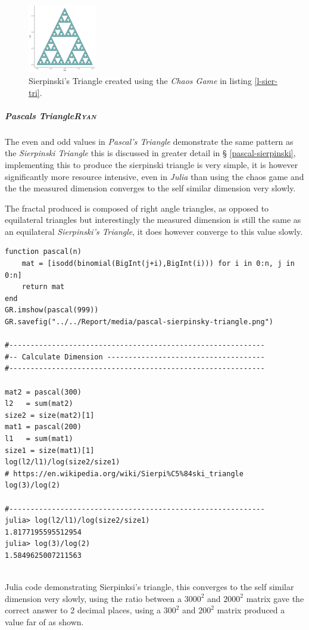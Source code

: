 \documentclass[a4paper,11pt,twoside]{article}
\begin{document}
\begin{figure}
\centering
\includegraphics[width=3cm]{pascal-sierpinsky-chaos-game.png}
\caption{\label{fig:s-tri}Sierpinski's Triangle created using the \emph{Chaos Game} in listing \ref{l-sier-tri}.}
\end{figure}

\subparagraph{Pascals Triangle\hfill{}\textsc{Ryan}}
\label{pas-tri}
The even and odd values in \emph{Pascal's Triangle} demonstrate the same pattern as
the \emph{Sierpinski Triangle} this is discussed in greater detail in \S
\ref{pascal-sierpinski}, implementing this to produce the sierpinski triangle is very
simple, it is however significantly more resource intensive, even in \emph{Julia}
than using the chaos game and the the measured dimension converges to the self
similar dimension very slowly.

The fractal produced is composed of right angle triangles, as opposed to equilateral triangles but interestingly the measured dimension is still the same as an equilateral \emph{Sierpinski's Triangle}, it does however converge to this value slowly.

\begin{listing}[htbp]
\begin{verbatim}
function pascal(n)
    mat = [isodd(binomial(BigInt(j+i),BigInt(i))) for i in 0:n, j in 0:n]
    return mat
end
GR.imshow(pascal(999))
GR.savefig("../../Report/media/pascal-sierpinsky-triangle.png")

#------------------------------------------------------------
#-- Calculate Dimension -------------------------------------
#------------------------------------------------------------

mat2 = pascal(300)
l2   = sum(mat2)
size2 = size(mat2)[1]
mat1 = pascal(200)
l1   = sum(mat1)
size1 = size(mat1)[1]
log(l2/l1)/log(size2/size1)
# https://en.wikipedia.org/wiki/Sierpi%C5%84ski_triangle
log(3)/log(2)

#------------------------------------------------------------
julia> log(l2/l1)/log(size2/size1)
1.8177195595512954
julia> log(3)/log(2)
1.5849625007211563


\end{verbatim}
\caption{\label{pascal-triangle-sierpinski}Julia code demonstrating Sierpinksi's triangle, this converges to the self similar dimension very slowly, using the ratio between a \(3000^{2}\) and \(2000^{2}\) matrix gave the correct answer to 2 decimal places, using a \(300^{2}\) and \(200^{2}\) matrix produced a value far of as shown.}
\end{listing}
\end{document}
